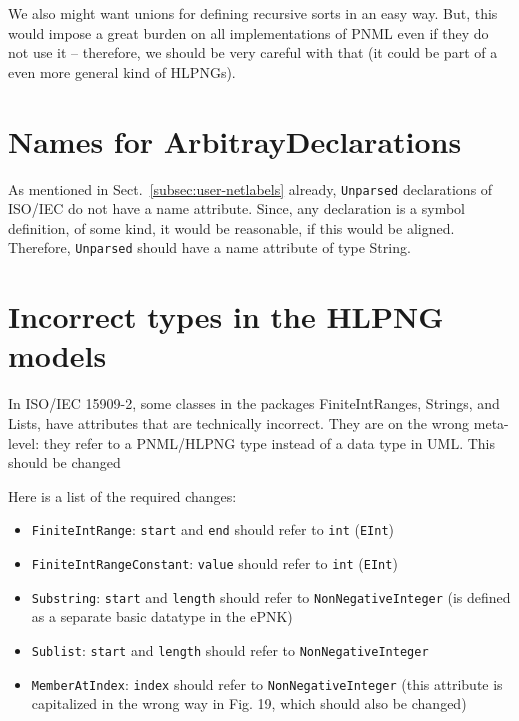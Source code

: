 We also might want unions for defining recursive sorts in an easy
way. But, this would impose a great burden on all implementations
of PNML even if they do not use it -- therefore, we should be
very careful with that (it could be part of a even more general
kind of HLPNGs).

\section{Names for ArbitrayDeclarations}

As mentioned in Sect.~\ref{subsec:user-netlabels} already, {\tt Unparsed}
declarations of ISO/IEC do not have a name attribute. Since, any
declaration is a symbol definition, of some kind, it would be
reasonable, if this would be aligned. Therefore, {\tt Unparsed}
should have a name attribute of type String.


\section{Incorrect types in the HLPNG models}   
\label{ISO-IEC15909-problem:typing} 
In ISO/IEC 15909-2, some classes in the packages FiniteIntRanges, Strings, and
Lists, have attributes that are technically incorrect. They are on the
wrong meta-level: they refer to a PNML/HLPNG type instead of a data type
in UML. This should be changed

Here is a list of the required changes:
\begin{itemize}
\item {\tt FiniteIntRange}: {\tt start} and {\tt end} should refer to {\tt int}
      ({\tt EInt})
       
\item {\tt FiniteIntRangeConstant}: {\tt value} should refer to {\tt int}
      ({\tt EInt})
      
\item {\tt Substring}: {\tt start} and {\tt length} should refer to
      {\tt NonNegativeInteger} (is defined as a separate basic datatype in the
      ePNK) 

\item {\tt Sublist}: {\tt start} and {\tt length}  should refer to {\tt NonNegativeInteger}
       
\item {\tt MemberAtIndex}: {\tt index} should refer to {\tt NonNegativeInteger}
      (this attribute is capitalized in the wrong way in Fig. 19, which should
      also be changed) 
\end{itemize}

